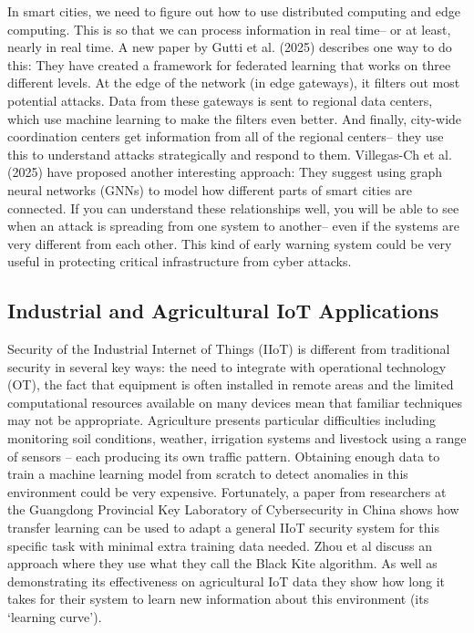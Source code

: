 \documentclass[12pt]{article}
\begin{document}
In smart cities, we need to figure out how to use distributed computing and edge computing. This is so that we can process information in real time– or at least, nearly in real time. A new paper by Gutti et al. (2025) describes one way to do this: They have created a framework for federated learning that works on three different levels. At the edge of the network (in edge gateways), it filters out most potential attacks. Data from these gateways is sent to regional data centers, which use machine learning to make the filters even better. And finally, city-wide coordination centers get information from all of the regional centers– they use this to understand attacks strategically and respond to them.
Villegas-Ch et al. (2025) have proposed another interesting approach: They suggest using graph neural networks (GNNs) to model how different parts of smart cities are connected. If you can understand these relationships well, you will be able to see when an attack is spreading from one system to another– even if the systems are very different from each other. This kind of early warning system could be very useful in protecting critical infrastructure from cyber attacks.

\subsection{Industrial and Agricultural IoT Applications}

Security of the Industrial Internet of Things (IIoT) is different from traditional security in several key ways: the need to integrate with operational technology (OT), the fact that equipment is often installed in remote areas and the limited computational resources available on many devices mean that familiar techniques may not be appropriate.
Agriculture presents particular difficulties including monitoring soil conditions, weather, irrigation systems and livestock using a range of sensors – each producing its own traffic pattern. Obtaining enough data to train a machine learning model from scratch to detect anomalies in this environment could be very expensive. Fortunately, a paper from researchers at the Guangdong Provincial Key Laboratory of Cybersecurity in China shows how transfer learning can be used to adapt a general IIoT security system for this specific task with minimal extra training data needed. Zhou et al discuss an approach where they use what they call the Black Kite algorithm. As well as demonstrating its effectiveness on agricultural IoT data they show how long it takes for their system to learn new information about this environment (its ‘learning curve’).
\end{document}
